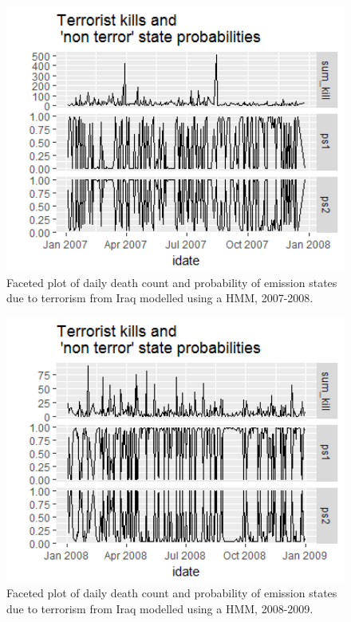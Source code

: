 \begin{figure}[t]
\includegraphics[width=15cm]{Peters_experiment_markdown_files/figure-latex/Rplot02_2007_2008.png}
\caption{Faceted plot of daily death count and probability of emission states due to terrorism from Iraq modelled using a HMM, 2007-2008.}
\label{fig:Rplot02_2007_2008}
\centering
\end{figure}

\begin{figure}[t]
\includegraphics[width=15cm]{Peters_experiment_markdown_files/figure-latex/Rplot02_200_2009.png}
\caption{Faceted plot of daily death count and probability of emission states due to terrorism from Iraq modelled using a HMM, 2008-2009.}
\label{fig:Rplot02_2008_2009}
\centering
\end{figure}

